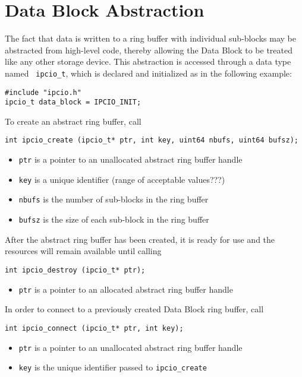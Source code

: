 \section{Data Block Abstraction}

The fact that data is written to a ring buffer with individual
sub-blocks may be abstracted from high-level code, thereby allowing
the Data Block to be treated like any other storage device.  This
abstraction is accessed through a data type named {\tt
ipcio\_t}, which is declared and initialized as in the following
example:
\begin{verbatim}
#include "ipcio.h"
ipcio_t data_block = IPCIO_INIT;
\end{verbatim}
To create an abstract ring buffer, call
\begin{verbatim}
int ipcio_create (ipcio_t* ptr, int key, uint64 nbufs, uint64 bufsz);
\end{verbatim}
\vspace{-3mm}
\begin{itemize}
\item {\tt ptr} is a pointer to an unallocated abstract ring buffer handle
\item {\tt key} is a unique identifier (range of acceptable values???)
\item {\tt nbufs} is the number of sub-blocks in the ring buffer
\item {\tt bufsz} is the size of each sub-block in the ring buffer
\end{itemize}
After the abstract ring buffer has been created, it is ready for use
and the resources will remain available until calling
\begin{verbatim}
int ipcio_destroy (ipcio_t* ptr);
\end{verbatim}
\vspace{-3mm}
\begin{itemize}
\item {\tt ptr} is a pointer to an allocated abstract ring buffer handle
\end{itemize}
In order to connect to a previously created Data Block ring buffer,
call
\begin{verbatim}
int ipcio_connect (ipcio_t* ptr, int key);
\end{verbatim}
\vspace{-3mm}
\begin{itemize}
\item {\tt ptr} is a pointer to an unallocated abstract ring buffer handle
\item {\tt key} is the unique identifier passed to {\tt ipcio\_create}
\end{itemize}
